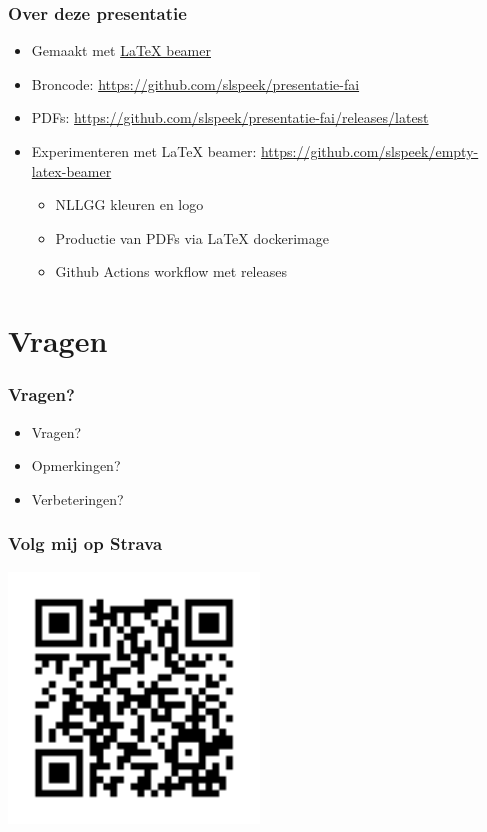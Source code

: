 \documentclass{beamer}
\newcommand{\reponame}{presentatie-fai}
\begin{document}
\begin{frame}
\frametitle{Over deze presentatie}
\begin{itemize}
  \item Gemaakt met \href{https://nl.mirrors.cicku.me/ctan/macros/latex/contrib/beamer/doc/beameruserguide.pdf}{\LaTeX{} beamer}
  \item Broncode: \url{https://github.com/slspeek/\reponame}
  \item PDFs: \url{https://github.com/slspeek/\reponame/releases/latest}
  \item Experimenteren met \LaTeX{} beamer: \url{https://github.com/slspeek/empty-latex-beamer}
  \begin{itemize}
    \item NLLGG kleuren en logo
    \item Productie van PDFs via \LaTeX{} dockerimage
    \item Github Actions workflow met releases
  \end{itemize}
\end{itemize}
\end{frame}

\section{Vragen}
\begin{frame}
\frametitle{Vragen?}
\begin{itemize}
  \item Vragen?
  \item<2-> Opmerkingen?
  \item<3-> Verbeteringen?
\end{itemize}
\end{frame}

\begin{frame}
\frametitle{Volg mij op Strava}
\centering
\includegraphics[width=0.5\textwidth]{img/qr-follow-me-on-strava.png}
\end{frame}
\end{document}
